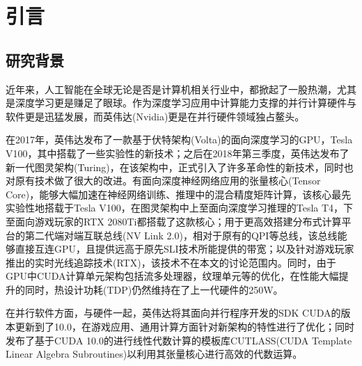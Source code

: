 \section{引言}

\subsection{研究背景}
\par 近年来，人工智能在全球无论是否是计算机相关行业中，都掀起了一股热潮，尤其是深度学习更是赚足了眼球。作为深度学习应用中计算能力支撑的并行计算硬件与软件更是迅猛发展，而英伟达(Nvidia)更是在并行硬件领域独占鳌头。
\par 在2017年，英伟达发布了一款基于伏特架构(Volta)的面向深度学习的GPU，Tesla V100\parencite{TESLAV100}，其中搭载了一些实验性的新技术；之后在2018年第三季度，英伟达发布了新一代图灵架构(Turing)，在该架构中，正式引入了许多革命性的新技术，同时也对原有技术做了很大的改进。有面向深度神经网络应用的张量核心(Tensor Core)\parencite{TENSORCORE}，能够大幅加速在神经网络训练、推理中的混合精度矩阵计算，该核心最先实验性地搭载于Tesla V100，在图灵架构中上至面向深度学习推理的Tesla T4，下至面向游戏玩家的RTX 2080Ti都搭载了这款核心；用于更高效搭建分布式计算平台的第二代端对端互联总线(NV Link 2.0)\parencite{NVLINK2}，相对于原有的QPI等总线，该总线能够直接互连GPU，且提供远高于原先SLI技术所能提供的带宽；以及针对游戏玩家推出的实时光线追踪技术(RTX)，该技术不在本文的讨论范围内。同时，由于GPU中CUDA计算单元架构包括流多处理器，纹理单元等的优化，在性能大幅提升的同时，热设计功耗(TDP)仍然维持在了上一代硬件的250W。
\par 在并行软件方面，与硬件一起，英伟达将其面向并行程序开发的SDK CUDA的版本更新到了10.0，在游戏应用、通用计算方面针对新架构的特性进行了优化；同时发布了基于CUDA 10.0的进行线性代数计算的模板库CUTLASS(CUDA Template Linear Algebra Subroutines)\parencite{CUTLASS}以利用其张量核心进行高效的代数运算。
